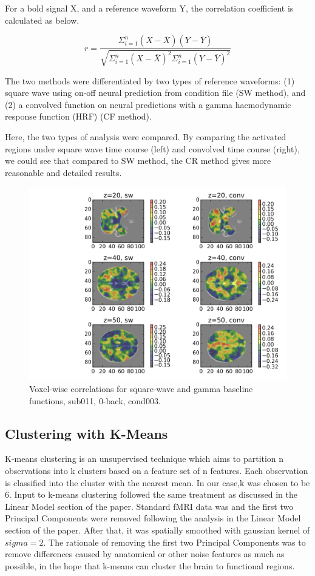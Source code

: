 \documentclass[11pt]{article}
\begin{document}
For a bold signal X, and a reference waveform Y, the correlation coefficient is
calculated as below.

\begin{equation}
r = \frac{\Sigma_{i=1}^{n}  ( X-\bar{X}) ( Y-\bar{Y})}{\sqrt{ \Sigma_{i=1}^{n} (
    X-\bar{X} ) ^2 \Sigma_{i=1}^{n} ( Y-\bar{Y})  ^2 }}
\end{equation}

The two methods were differentiated by two types of reference
waveforms: (1) square wave using on-off neural prediction from condition file
(SW method), and (2) a convolved function on neural predictions with a gamma
haemodynamic response function (HRF) (CF method).

Here, the two types of analysis were compared. By comparing
the activated regions under square wave time course (left) and convolved time
course (right), we could see that compared to SW method, the CR method gives 
more reasonable and detailed results.

\begin{figure}[H]
\centering
\includegraphics[scale=0.7]{../results/sub011_voxel_wise_correlation_across_methods.png}
\caption{Voxel-wise correlations for square-wave and gamma baseline functions, sub011, 0-back, cond003.}
\end{figure} 

\subsection{Clustering with K-Means}

K-means clustering is an unsupervised technique which aims to partition n
observations into k clusters based on a feature set of n features. Each
observation is classified into the cluster with the nearest mean. In our case,k was
chosen to be 6. Input to k-means clustering followed the same treatment as discussed
in the Linear Model section of the paper. Standard fMRI data was and the first two 
Principal Components were removed following the analysis in the Linear Model section 
of the paper. After that, it was spatially smoothed with gaussian kernel
of $sigma=2$. The rationale of removing the first two Principal Components was to
remove differences caused by anatomical or other noise features as much as possible, in
the hope that k-means can cluster the brain to functional regions.
\end{document}
